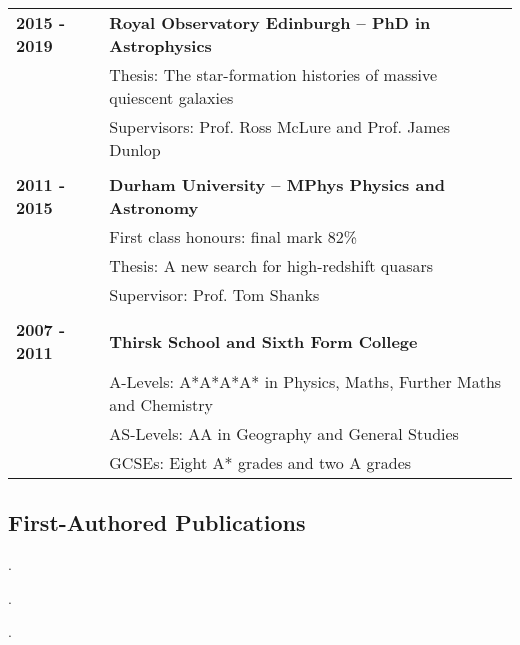 \documentclass[a4paper,fleqn,usenatbib,onecolumn]{mnras}
\title[Adam Carnall]{\center{Adam Carnall}}
\author[Adam Carnall]{PhD Student, Institute for Astronomy, Royal Observatory Edinburgh, EH9 3HJ, adamc@roe.ac.uk
\\
}
\begin{document}
\maketitle



\large

\begingroup
\setlength{\tabcolsep}{0pt} %
\renewcommand{\arraystretch}{1.1} %
\begin{tabular}{ p{3cm} p{14cm} }
\\
\bf{2015 - 2019} & \bf{Royal Observatory Edinburgh -- PhD in Astrophysics}\\
& Thesis: The star-formation histories of massive quiescent galaxies \\
& Supervisors: Prof. Ross McLure and Prof. James Dunlop\\
\\
\bf{2011 - 2015} & \bf{Durham University -- MPhys Physics and Astronomy} \\          
& First class honours: final mark 82\% \\
& Thesis: A new search for high-redshift quasars\\
& Supervisor: Prof. Tom Shanks\\
\\
\bf{2007 - 2011} &  \bf{Thirsk School and Sixth Form College} \\
 & A-Levels: A*A*A*A* in Physics, Maths, Further Maths and Chemistry \\
  & AS-Levels: AA in Geography and General Studies \\
 & GCSEs: Eight A* grades and two A grades
\end{tabular}
\endgroup

\subsection*{First-Authored Publications}


\hangindent=0.45cm . 

\medskip

\hangindent=0.45cm . 

\medskip

\hangindent=0.45cm . 
\end{document}
